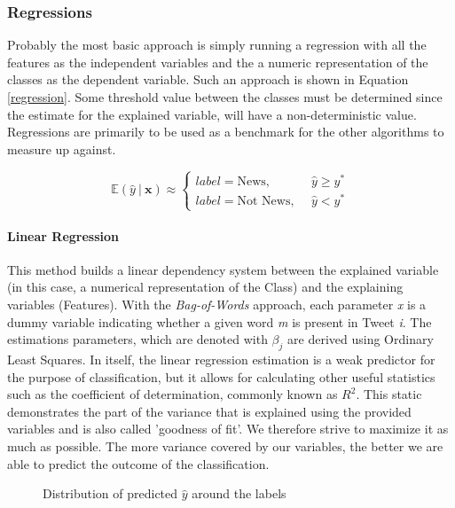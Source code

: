 	\subsubsection{Regressions}
	Probably the most basic approach is simply running a regression with all the features as the independent variables and the a numeric representation of the classes as the dependent variable. Such an approach is shown in Equation \ref{regression}. Some threshold value between the classes must be determined since the estimate for the explained variable, will have a non-deterministic value. Regressions are primarily to be used as a benchmark for the other algorithms to measure up against.
	
	\begin{equation}
		\mathbb{E}(\hat{y} \ \vert \ \textbf{x}) \approx 
		\begin{cases}
			label = \text{News}, &\hat{y} \geq y^* \\
			label = \text{Not News},\ \ &\hat{y} < y^*
		\end{cases}
		\label{regression}
	\end{equation}
	
	\par
	\paragraph{Linear Regression}
		This method builds a linear dependency system between the explained variable (in this case, a numerical representation of the Class) and the explaining variables (Features). With the \textit{Bag-of-Words} approach, each parameter \textit{x} is a dummy variable indicating whether a given word \textit{m} is present in Tweet \textit{i}. The estimations parameters, which are denoted with $\beta_j$ are derived using Ordinary Least Squares. In itself, the linear regression estimation is a weak predictor for the purpose of classification, but it allows for calculating other useful statistics such as the coefficient of determination, commonly known as $R^2$. This static demonstrates the part of the variance that is explained using the provided variables and is also called 'goodness of fit'. We therefore strive to maximize it as much as possible. The more variance covered by our variables, the better we are able to predict the outcome of the classification. 
		
		\begin{figure}[h]
			\centering
			\scalebox{0.8}{}
			\captionsetup{width=0.8\textwidth}
			\caption{Distribution of predicted $ \hat{y} $ around the labels}
			\label{fig:y_dist_reg}
		\end{figure}
		
